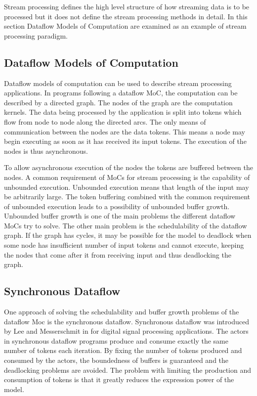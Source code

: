 Stream processing defines the high level structure of how streaming data is to be processed but it does not define the stream processing methods in detail. In this section Dataflow Models of Computation are examined as an example of stream processing paradigm.

\subsection{Dataflow Models of Computation}
\label{subsec:dataflow-moc}
Dataflow models of computation can be used to describe stream processing applications. In programs following a dataflow MoC, the computation can be described by a directed graph. The nodes of the graph are the computation kernels. The data being processed by the application is split into tokens which flow from node to node along the directed arcs. The only means of communication between the nodes are the data tokens. This means a node may begin executing as soon as it has received its input tokens. The execution of the nodes is thus asynchronous.~\cite{lee2015introduction}

To allow asynchronous execution of the nodes the tokens are buffered between the nodes. A common requirement of MoCs for stream processing is the capability of unbounded execution. Unbounded execution means that length of the input may be arbitrarily large. The token buffering combined with the common requirement of unbounded execution leads to a possibility of unbounded buffer growth. Unbounded buffer growth is one of the main problems the different dataflow MoCs try to solve. The other main problem is the schedulability of the dataflow graph. If the graph has cycles, it may be possible for the model to deadlock when some node has insufficient number of input tokens and cannot execute, keeping the nodes that come after it from receiving input and thus deadlocking the graph.~\cite{lee2015introduction}

\subsection{Synchronous Dataflow}
\label{subsec:synchronous-dataflow}
One approach of solving the schedulability and buffer growth problems of the dataflow Moc is the synchronous dataflow. Synchronous dataflow was introduced by Lee and Messerschmit in \cite{lee1987synchronous} for digital signal processing applications. The actors in synchronous dataflow programs produce and consume exactly the same number of tokens each iteration. By fixing the number of tokens produced and consumed by the actors, the boundedness of buffers is guaranteed and the deadlocking problems are avoided. The problem with limiting the production and consumption of tokens is that it greatly reduces the expression power of the model.~\cite{lee2015introduction}

